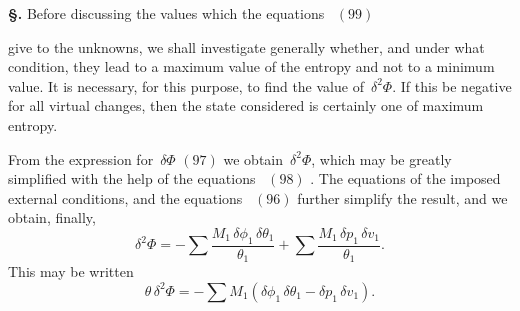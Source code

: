 \documentclass[12pt]{book}[2005/09/16]
\newcommand{\Chg}[2]{#2}
\newcommand{\Add}[1]{\Chg{}{#1}}
\newcommand{\Section}[1]{
  \medskip\par\textbf{§\;#1}
  \label{section:#1}
}
\newcommand{\Eq}[1]{%
  \hyperref[eqn:#1]{\ensuremath{#1}}%
}
\newcommand{\PageSep}[1]{\ignorespaces}
\newcommand{\tsum}{\mathop{\textstyle\sum}\limits}
\begin{document}
\Section{169.} Before discussing the values which the equations~\Eq{(99)}
%
%
%
give to the unknowns, we shall investigate generally
whether, and under what condition, they lead to a maximum
value of the entropy and not to a minimum value. It is
necessary, for this purpose, to find the value of~$\delta^{2} \Phi$. If
this be negative for all virtual changes, then the state
considered is certainly one of maximum entropy.

From the expression for~$\delta \Phi$ \Eq{(97)} we obtain~$\delta^{2} \Phi$, which
may be greatly simplified with the help of the equations~\Eq{(98)}.
The equations of the imposed external conditions,
and the equations~\Eq{(96)} further simplify the result, and we
obtain, finally,
\[
\delta^{2} \Phi
  = -\tsum \frac{M_{1}\, \delta \phi_{1}\, \delta \theta_{1}}{\theta_{1}}
   + \tsum \frac{M_{1}\, \delta p_{1}\, \delta v_{1}}{\theta_{1}}.
\]
This may be written
\[
\theta\, \delta^{2} \Phi = -\tsum M_{1} (\delta \phi_{1}\, \delta \theta_{1} - \delta p_{1}\, \delta v_{1})\Add{.}
\]
\PageSep{137}
\end{document}

